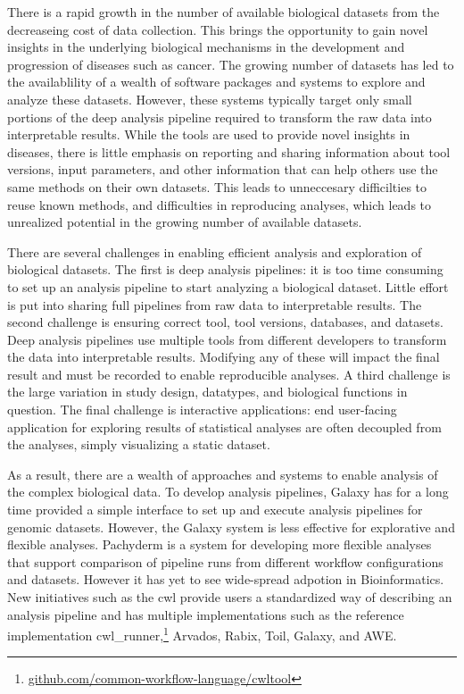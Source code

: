
There is a rapid growth in the number of available biological datasets from the
decreaseing cost of data collection. This brings the opportunity to gain novel
insights in the underlying biological mechanisms in the development and
progression of diseases such as cancer. The growing number of datasets has led
to the availablility of a wealth of software packages and systems to explore and
analyze these datasets. However, these systems typically target only small
portions of the deep analysis pipeline required to transform the raw data into
interpretable results. While the tools are used to provide novel insights in
diseases, there is little emphasis on reporting and sharing information about
tool versions, input parameters, and other information that can help others use
the same methods on their own datasets. This leads to unneccesary difficilties
to reuse known methods, and difficulties in reproducing analyses, which leads
to unrealized potential in the growing number of available datasets. 


There are several challenges in enabling efficient analysis and exploration of
biological datasets.
The first is deep analysis pipelines: it is too time consuming to set up an
analysis pipeline to start analyzing a biological dataset. Little effort is put
into sharing full pipelines from raw data to interpretable results.
The second challenge is ensuring correct tool, tool versions, databases, and
datasets. Deep analysis pipelines use multiple tools from different developers
to transform the data into interpretable results. Modifying any of these will
impact the final result and must be recorded to enable reproducible analyses. 
A third challenge is the large variation in study design, datatypes,
and biological functions in question.
The final challenge is interactive applications: end user-facing application
for exploring results of statistical analyses are often decoupled from the
analyses, simply visualizing a static dataset.  

As a result, there are a wealth of approaches and systems to enable analysis of
the complex biological data. To develop analysis pipelines, Galaxy\cite{galaxy}
has for a long time provided a simple interface to set up and execute analysis
pipelines for genomic datasets. However, the Galaxy system is less effective for
explorative and flexible analyses.\cite{spjuth2015experiences}
Pachyderm\cite{pachyderm} is a system for developing more flexible analyses that
support comparison of pipeline runs from different workflow configurations and
datasets. However it has yet to see wide-spread adpotion in Bioinformatics.
New initiatives such as the \gls{cwl} provide users a standardized way of
describing an analysis pipeline and has multiple implementations such as
the reference implementation
cwl\_runner,\footnote{\url{github.com/common-workflow-language/cwltool}}
Arvados,\cite{arvados} Rabix,\cite{rabix} Toil,\cite{toil} Galaxy,\cite{galaxy}
and AWE.\cite{awe} 


